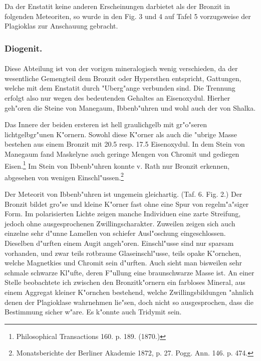 \documentclass[a4paper, 11pt, oneside, polutonikogreek, german]{article}
\begin{document}
Da der Enstatit keine anderen Erscheinungen darbietet als der Bronzit in folgenden Meteoriten, so wurde in den Fig. 3 und 4 auf Tafel 5 vorzugsweise der Plagioklas zur Anschauung gebracht.

\subsubsection{Diogenit.}
\paragraph{}
Diese Abteilung ist von der vorigen mineralogisch wenig verschieden, da der wesentliche Gemengteil dem Bronzit oder Hypersthen entspricht, Gattungen, welche mit dem Enstatit durch "Uberg"ange verbunden sind. Die Trennung erfolgt also nur wegen des bedeutenden Gehaltes an Eisenoxydul. Hierher geh"oren die Steine von Manegaum, Ibbenb"uhren und wohl auch der von Shalka.

Das Innere der beiden ersteren ist hell graulichgelb mit gr"o"seren lichtgelbgr"unen K"ornern. Sowohl diese K"orner als auch die "ubrige Masse bestehen aus einem Bronzit mit 20.5 resp. 17.5 Eisenoxydul. In dem Stein von Manegaum fand Maskelyne auch geringe Mengen von Chromit und gediegen Eisen.\footnote{Philosophical Transactions 160. p. 189. (1870.)} Im Stein von Ibbenb"uhren konnte v. Rath nur Bronzit erkennen, abgesehen von wenigen Einschl"ussen.\footnote{Monatsberichte der Berliner Akademie 1872, p. 27. Pogg. Ann. 146. p. 474.}

Der Meteorit von Ibbenb"uhren ist ungemein gleichartig. (Taf. 6. Fig. 2.) Der Bronzit bildet gro"se und kleine K"orner fast ohne eine Spur von regelm"a"siger Form. Im polarisierten Lichte zeigen manche Individuen eine zarte Streifung, jedoch ohne ausgesprochenen Zwillingscharakter. Zuweilen zeigen sich auch einzelne sehr d"unne Lamellen von schiefer Ausl"oschung eingeschlossen. Dieselben d"urften einem Augit angeh"oren. Einschl"usse sind nur sparsam vorhanden, und zwar teils rotbraune Glaseinschl"usse, teils opake K"ornchen, welche Magnetkies und Chromit sein d"urften. Auch sieht man bisweilen sehr schmale schwarze Kl"ufte, deren F"ullung eine braunschwarze Masse ist. An einer Stelle beobachtete ich zwischen den Bronzitk"ornern ein farbloses Mineral, aus einem Aggregat kleiner K"ornchen bestehend, welche Zwillingsbildungen "ahnlich denen der Plagioklase wahrnehmen lie"sen, doch nicht so ausgesprochen, dass die Bestimmung sicher w"are. Es k"onnte auch Tridymit sein.
\end{document}

